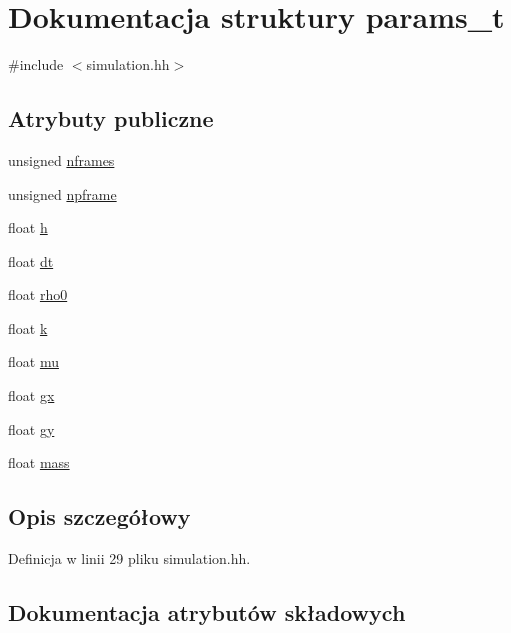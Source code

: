 \hypertarget{structparams__t}{}\section{Dokumentacja struktury params\+\_\+t}
\label{structparams__t}


{\ttfamily \#include $<$simulation.\+hh$>$}

\subsection*{Atrybuty publiczne}
\begin{DoxyCompactItemize}
\item 
unsigned \hyperlink{structparams__t_a2cecc28f4ca024657cf567047e2aba59}{nframes}
\item 
unsigned \hyperlink{structparams__t_a06a1a567fd5ba13905514227e2bb710a}{npframe}
\item 
float \hyperlink{structparams__t_a27d76064f2ae0cb93a0956027cfcc19b}{h}
\item 
float \hyperlink{structparams__t_a81fc6596e9b1446442ebf3eef2c3fb01}{dt}
\item 
float \hyperlink{structparams__t_a2eb309edb681d0a998f23fc692a73781}{rho0}
\item 
float \hyperlink{structparams__t_a97ee2783cf89cee1151be3250e9054b3}{k}
\item 
float \hyperlink{structparams__t_a971359c29b2f946b477e4a1b3605fa3f}{mu}
\item 
float \hyperlink{structparams__t_a9f3f70c0cdedcb053c9d45c2e41e67b6}{gx}
\item 
float \hyperlink{structparams__t_a0da484b4cc6a542875aa7b92e200f507}{gy}
\item 
float \hyperlink{structparams__t_afe4a59fe43565a71a0a7a155714e2af1}{mass}
\end{DoxyCompactItemize}


\subsection{Opis szczegółowy}


Definicja w linii 29 pliku simulation.\+hh.



\subsection{Dokumentacja atrybutów składowych}
\hypertarget{structparams__t_a81fc6596e9b1446442ebf3eef2c3fb01}{}
